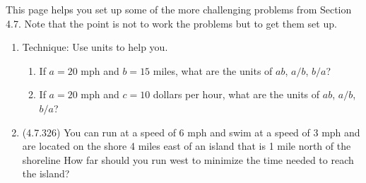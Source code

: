 \documentclass[12pt]{article}
\begin{document}
\addtolength\itemsep{-1mm}

This page helps you set up some of the more challenging problems from Section 4.7. Note that the point is not to work the problems but to get them set up.
\begin{enumerate}
\item Technique: Use units to help you. 
\begin{enumerate}
	\item If $a=20$ mph and $b=15$ miles, what are the units of $ab$, $a/b$, $b/a$?\\
	\item If $a=20$ mph and $c=10$ dollars per hour, what are the units of $ab$, $a/b$, $b/a$?\\
\end{enumerate}

\item (4.7.326) You can run at a speed of 6 mph and swim at a speed of 3 mph and are located on the shore 4 miles east of an island that is 1 mile north of the shoreline How far should you run west to minimize the time needed to reach the island?




\end{enumerate}
\end{document}
